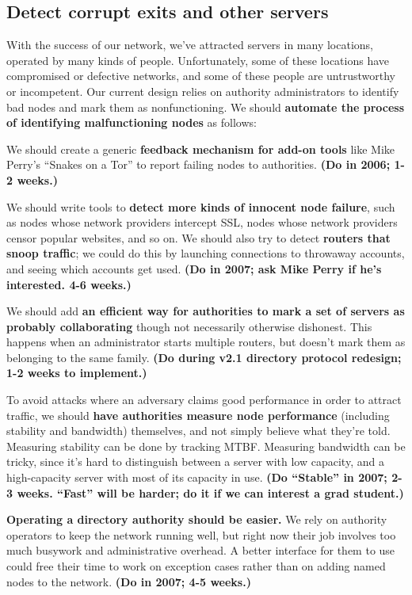 \documentclass{article}
\newcommand{\plan}[1]{ {\bf (#1)}}
\begin{document}
\subsection{Detect corrupt exits and other servers}
With the success of our network, we've attracted servers in many locations,
operated by many kinds of people.  Unfortunately, some of these locations
have compromised or defective networks, and some of these people are
untrustworthy or incompetent.  Our current design relies on authority
administrators to identify bad nodes and mark them as nonfunctioning.  We
should {\bf automate the process of identifying malfunctioning nodes} as
follows:

We should create a generic {\bf feedback mechanism for add-on tools} like
Mike Perry's ``Snakes on a Tor'' to report failing nodes to authorities.
\plan{Do in 2006; 1-2 weeks.}

We should write tools to {\bf detect more kinds of innocent node failure},
such as nodes whose network providers intercept SSL, nodes whose network
providers censor popular websites, and so on.  We should also try to detect
{\bf routers that snoop traffic}; we could do this by launching connections
to throwaway accounts, and seeing which accounts get used.\plan{Do in 2007;
  ask Mike Perry if he's interested.  4-6 weeks.}

We should add {\bf an efficient way for authorities to mark a set of servers
  as probably collaborating} though not necessarily otherwise dishonest.
This happens when an administrator starts multiple routers, but doesn't mark
them as belonging to the same family.\plan{Do during v2.1 directory protocol
  redesign; 1-2 weeks to implement.}

To avoid attacks where an adversary claims good performance in order to
attract traffic, we should {\bf have authorities measure node performance}
(including stability and bandwidth) themselves, and not simply believe what
they're told.  Measuring stability can be done by tracking MTBF.  Measuring
bandwidth can be tricky, since it's hard to distinguish between a server with
low capacity, and a high-capacity server with most of its capacity in
use.\plan{Do ``Stable'' in 2007; 2-3 weeks.  ``Fast'' will be harder; do it
  if we can interest a grad student.}

{\bf Operating a directory authority should be easier.}  We rely on authority
operators to keep the network running well, but right now their job involves
too much busywork and administrative overhead.  A better interface for them
to use could free their time to work on exception cases rather than on
adding named nodes to the network.\plan{Do in 2007; 4-5 weeks.}
\end{document}
